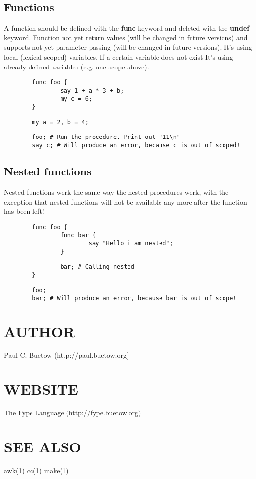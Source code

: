 \subsection*{Functions\label{Functions}}


A function should be defined with the \textbf{func} keyword and deleted with the \textbf{undef} keyword. Function not yet return values (will be changed in future versions) and supports not yet parameter passing (will be changed in future versions). It's using local (lexical scoped) variables. If a certain variable does not exist It's using already defined variables (e.g. one scope above).

\begin{verbatim}
        func foo {
                say 1 + a * 3 + b;
                my c = 6;
        }
\end{verbatim}
\begin{verbatim}
        my a = 2, b = 4;
\end{verbatim}
\begin{verbatim}
        foo; # Run the procedure. Print out "11\n"
        say c; # Will produce an error, because c is out of scoped!
\end{verbatim}
\subsection*{Nested functions\label{Nested_functions}}


Nested functions work the same way the nested procedures work, with the exception that nested functions will not be available any more after the function has been left!

\begin{verbatim}
        func foo {
                func bar {
                        say "Hello i am nested";
                }
\end{verbatim}
\begin{verbatim}
                bar; # Calling nested
        }
\end{verbatim}
\begin{verbatim}
        foo;
        bar; # Will produce an error, because bar is out of scope!
\end{verbatim}
\section{AUTHOR\label{AUTHOR}}


Paul C. Buetow (http://paul.buetow.org)

\section{WEBSITE\label{WEBSITE}}


The Fype Language (http://fype.buetow.org)

\section{SEE ALSO\label{SEE_ALSO}}


awk(1) cc(1) make(1)

